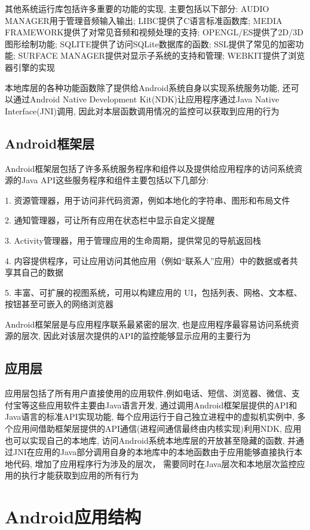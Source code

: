 其他系统运行库包括许多重要的功能的实现, 主要包括以下部分: 
AUDIO MANAGER用于管理音频输入输出; 
LIBC提供了C语言标准函数库; 
MEDIA FRAMEWORK提供了对常见音频和视频处理的支持; 
OPENGL/ES提供了2D/3D图形绘制功能;
SQLITE提供了访问SQLite数据库的函数;
SSL提供了常见的加密功能;
SURFACE MANAGER提供对显示子系统的支持和管理;
WEBKIT提供了浏览器引擎的实现\juhao

本地库层的各种功能函数除了提供给Android系统自身以实现系统服务功能, 还可以通过Android Native Development Kit(NDK)让应用程序通过Java Native Interface(JNI)调用, 因此对本层函数调用情况的监控可以获取到应用的行为\juhao

\subsection*{Android框架层}
Android框架层包括了许多系统服务程序和组件以及提供给应用程序的访问系统资源的Java API\juhao 这些服务程序和组件主要包括以下几部分:

1. 资源管理器，用于访问非代码资源，例如本地化的字符串、图形和布局文件

2. 通知管理器，可让所有应用在状态栏中显示自定义提醒

3. Activity管理器，用于管理应用的生命周期，提供常见的导航返回栈

4. 内容提供程序，可让应用访问其他应用（例如“联系人”应用）中的数据或者共享其自己的数据

5. 丰富、可扩展的视图系统，可用以构建应用的 UI，包括列表、网格、文本框、按钮甚至可嵌入的网络浏览器

Android框架层是与应用程序联系最紧密的层次, 也是应用程序最容易访问系统资源的层次, 因此对该层次提供的API的监控能够显示应用的主要行为\juhao

\subsection*{应用层}
应用层包括了所有用户直接使用的应用软件,例如电话、短信、浏览器、微信、支付宝等\juhao 这些应用软件主要由Java语言开发, 通过调用Android框架层提供的API和Java语言的标准API实现功能, 每个应用运行于自己独立进程中的虚拟机实例中, 多个应用间借助框架层提供的API通信(进程间通信最终由内核实现)\juhao 利用NDK, 应用也可以实现自己的本地库, 访问Android系统本地库层的开放甚至隐藏的函数, 并通过JNI在应用的Java部分调用自身的本地库中的本地函数\juhao 由于应用能够直接执行本地代码, 增加了应用程序行为涉及的层次， 需要同时在Java层次和本地层次监控应用的执行才能获取到应用的所有行为\juhao


\section{Android应用结构}

